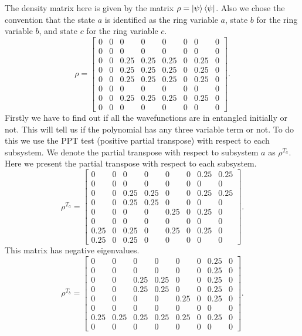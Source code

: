 \documentclass{amsart}
\theoremstyle{plain}
\theoremstyle{definition}
\theoremstyle{plain}
\begin{document}
 	The density matrix here is given by the matrix $\rho = \ket{\psi}\bra{\psi}$. Also we chose the convention that the state $a$ is identified as the ring variable $a$,  state $b$ for the ring variable $b$, and state $c$ for the ring variable $c$.
 	\begin{equation*}
 		\rho = \left[\begin{matrix}0 & 0 & 0 & 0 & 0 & 0 & 0 & 0\\0 & 0 & 0 & 0 & 0 & 0 & 0 & 0\\0 & 0 & 0.25 & 0.25 & 0.25 & 0 & 0.25 & 0\\0 & 0 & 0.25 & 0.25 & 0.25 & 0 & 0.25 & 0\\0 & 0 & 0.25 & 0.25 & 0.25 & 0 & 0.25 & 0\\0 & 0 & 0 & 0 & 0 & 0 & 0 & 0\\0 & 0 & 0.25 & 0.25 & 0.25 & 0 & 0.25 & 0\\0 & 0 & 0 & 0 & 0 & 0 & 0 & 0\end{matrix}\right].
 	\end{equation*}
 	Firstly we have to find out if all the wavefunctions are in entangled initially or not. This will tell us if the polynomial has any three variable term or not. To do this we use the PPT test (positive partial transpose) with respect to each subsystem.
 	We denote the partial transpose with respect to subsystem $a$ as $\rho^{T_a}$. Here we present the partial transpose with respect to each subsystem.
 	\begin{equation*}
 		\rho^{T_a} = \left[\begin{matrix}0 & 0 & 0 & 0 & 0 & 0 & 0.25 & 0.25\\0 & 0 & 0 & 0 & 0 & 0 & 0 & 0\\0 & 0 & 0.25 & 0.25 & 0 & 0 & 0.25 & 0.25\\0 & 0 & 0.25 & 0.25 & 0 & 0 & 0 & 0\\0 & 0 & 0 & 0 & 0.25 & 0 & 0.25 & 0\\0 & 0 & 0 & 0 & 0 & 0 & 0 & 0\\0.25 & 0 & 0.25 & 0 & 0.25 & 0 & 0.25 & 0\\0.25 & 0 & 0.25 & 0 & 0 & 0 & 0 & 0\end{matrix}\right].
 	\end{equation*}
 	This matrix has negative eigenvalues.
 	\begin{equation*}
 		\rho^{T_b} = \left[\begin{matrix}0 & 0 & 0 & 0 & 0 & 0 & 0.25 & 0\\0 & 0 & 0 & 0 & 0 & 0 & 0.25 & 0\\0 & 0 & 0.25 & 0.25 & 0 & 0 & 0.25 & 0\\0 & 0 & 0.25 & 0.25 & 0 & 0 & 0.25 & 0\\0 & 0 & 0 & 0 & 0.25 & 0 & 0.25 & 0\\0 & 0 & 0 & 0 & 0 & 0 & 0 & 0\\0.25 & 0.25 & 0.25 & 0.25 & 0.25 & 0 & 0.25 & 0\\0 & 0 & 0 & 0 & 0 & 0 & 0 & 0\end{matrix}\right].
 	\end{equation*}
\end{document}
